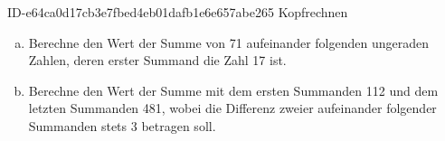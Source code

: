\begin{exercise}
      {ID-e64ca0d17cb3e7fbed4eb01dafb1e6e657abe265}
      {Kopfrechnen}
  \ifproblem\problem\par
    \begin{enumerate}[a)]
      \item Berechne den Wert der Summe von 71 aufeinander folgenden ungeraden
            Zahlen, deren erster Summand die Zahl 17 ist.
      \item Berechne den Wert der Summe mit dem ersten Summanden 112 und dem
            letzten Summanden 481, wobei die Differenz zweier aufeinander folgender
            Summanden stets 3 betragen soll.
    \end{enumerate}
  \fi
\end{exercise}
